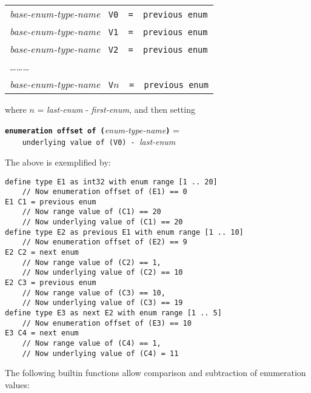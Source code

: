\documentclass[12pt]{article}
\newcommand{\TT}[1]{{\tt \bfseries #1}}
\newenvironment{indpar}[1][0.3in]%
	{\begin{list}{}%
		     {\setlength{\itemsep}{0in}%
		      \setlength{\topsep}{0in}%
		      \setlength{\parsep}{1ex}%
		      \setlength{\labelwidth}{#1}%
		      \setlength{\leftmargin}{#1}%
		      \addtolength{\leftmargin}{\labelsep}}%
	 \item}%
	{\end{list}}
\newenvironment{itemlist}[1][0.5in]%
	{\begin{list}{}{\setlength{\labelwidth}{#1}%
	                \setlength{\leftmargin}{#1}%
		        \addtolength{\leftmargin}{\labelsep}}}%
	{\end{list}}
\begin{document}
\begin{indpar}
\begin{itemlist}
\begin{center}
\begin{tabular}{l}
{\em base-enum-type-name} {\tt ~V0~~=~~previous enum} \\
{\em base-enum-type-name} {\tt ~V1~~=~~previous enum} \\
{\em base-enum-type-name} {\tt ~V2~~=~~previous enum} \\
\ldots\ldots\ldots \\
{\em base-enum-type-name} {\tt ~V$n$~~=~~previous enum} \\
\end{tabular}
\end{center}
where $n$ = {\em last-enum} - {\em first-enum}, and then setting
\begin{center}
\TT{enumeration offset of (}{\em enum-type-name}\TT{)} = \\
{\tt ~~~~underlying value of (V0)~-~}{\em last-enum}
\end{center}
\end{itemlist}
\end{indpar}

The above is exemplified by:
\begin{indpar}\begin{verbatim}
define type E1 as int32 with enum range [1 .. 20]
    // Now enumeration offset of (E1) == 0
E1 C1 = previous enum
    // Now range value of (C1) == 20
    // Now underlying value of (C1) == 20
define type E2 as previous E1 with enum range [1 .. 10]
    // Now enumeration offset of (E2) == 9
E2 C2 = next enum 
    // Now range value of (C2) == 1,
    // Now underlying value of (C2) == 10
E2 C3 = previous enum 
    // Now range value of (C3) == 10,
    // Now underlying value of (C3) == 19
define type E3 as next E2 with enum range [1 .. 5]
    // Now enumeration offset of (E3) == 10
E3 C4 = next enum 
    // Now range value of (C4) == 1,
    // Now underlying value of (C4) = 11
\end{verbatim}\end{indpar}

The following builtin functions allow comparison and subtraction
of enumeration values:
\end{document}
